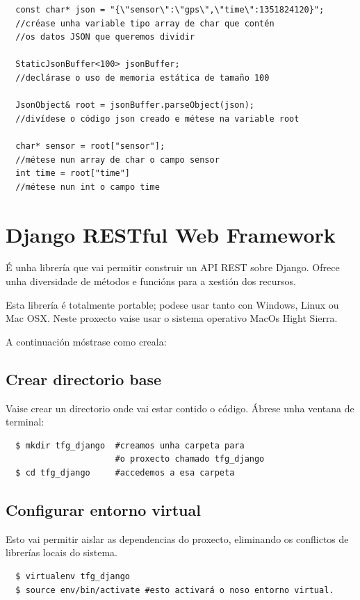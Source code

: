 \documentclass[11pt,twoside]{book}
\begin{document}
\begin{verbatim}
  const char* json = "{\"sensor\":\"gps\",\"time\":1351824120}";
  //créase unha variable tipo array de char que contén
  //os datos JSON que queremos dividir
  
  StaticJsonBuffer<100> jsonBuffer;
  //declárase o uso de memoria estática de tamaño 100
  
  JsonObject& root = jsonBuffer.parseObject(json);
  //divídese o código json creado e métese na variable root
  
  char* sensor = root["sensor"]; 
  //métese nun array de char o campo sensor
  int time = root["time"]        
  //métese nun int o campo time
\end{verbatim}

\section{Django RESTful Web Framework}

É unha librería que vai permitir construir un API REST sobre Django. Ofrece unha diversidade de métodos e funcións para a xestión dos recursos.

Esta librería é totalmente portable; podese usar tanto con Windows, Linux ou Mac OSX. Neste proxecto vaise usar o sistema operativo MacOs Hight Sierra.

A continuación móstrase como creala:

\subsection{Crear directorio base}

Vaise crear un directorio onde vai estar contido o código. Ábrese unha ventana de terminal:

\begin{verbatim}
  $ mkdir tfg_django  #creamos unha carpeta para 
                      #o proxecto chamado tfg_django
  $ cd tfg_django     #accedemos a esa carpeta
\end{verbatim}

\subsection{Configurar entorno virtual}

Esto vai permitir aislar as dependencias do proxecto, eliminando os conflictos de librerías locais do sistema.
\begin{verbatim}
  $ virtualenv tfg_django
  $ source env/bin/activate #esto activará o noso entorno virtual.
\end{verbatim}
\end{document}
